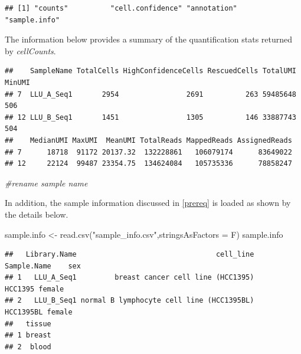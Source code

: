 \documentclass[
  openany]{book}
\newenvironment{Shaded}{\begin{snugshade}}{\end{snugshade}}
\newcommand{\AttributeTok}[1]{\textcolor[rgb]{0.77,0.63,0.00}{#1}}
\newcommand{\CommentTok}[1]{\textcolor[rgb]{0.56,0.35,0.01}{\textit{#1}}}
\newcommand{\FunctionTok}[1]{\textcolor[rgb]{0.00,0.00,0.00}{#1}}
\newcommand{\NormalTok}[1]{#1}
\newcommand{\OtherTok}[1]{\textcolor[rgb]{0.56,0.35,0.01}{#1}}
\newcommand{\SpecialCharTok}[1]{\textcolor[rgb]{0.00,0.00,0.00}{#1}}
\newcommand{\StringTok}[1]{\textcolor[rgb]{0.31,0.60,0.02}{#1}}
\begin{document}
\begin{verbatim}
## [1] "counts"          "cell.confidence" "annotation"      "sample.info"
\end{verbatim}

The information below provides a summary of the quantification stats returned by \emph{cellCounts}.

\begin{Shaded}
\end{Shaded}

\begin{verbatim}
##    SampleName TotalCells HighConfidenceCells RescuedCells TotalUMI MinUMI
## 7  LLU_A_Seq1       2954                2691          263 59485648    506
## 12 LLU_B_Seq1       1451                1305          146 33887743    504
##    MedianUMI MaxUMI  MeanUMI TotalReads MappedReads AssignedReads
## 7      18718  91172 20137.32  132228861   106079174      83649022
## 12     22124  99487 23354.75  134624084   105735336      78858247
\end{verbatim}

\begin{Shaded}
\begin{Highlighting}[]
\CommentTok{\#rename sample name}
\end{Highlighting}
\end{Shaded}

In addition, the sample information discussed in \ref{prereq} is loaded as shown by the details below.

\begin{Shaded}
\begin{Highlighting}[]
\NormalTok{sample.info }\OtherTok{\textless{}{-}} \FunctionTok{read.csv}\NormalTok{(}\StringTok{"sample\_info.csv"}\NormalTok{,}\AttributeTok{stringsAsFactors =}\NormalTok{ F)}
\NormalTok{sample.info}
\end{Highlighting}
\end{Shaded}

\begin{verbatim}
##   Library.Name                                 cell_line Sample.Name    sex
## 1   LLU_A_Seq1         breast cancer cell line (HCC1395)     HCC1395 female
## 2   LLU_B_Seq1 normal B lymphocyte cell line (HCC1395BL)   HCC1395BL female
##   tissue
## 1 breast
## 2  blood
\end{verbatim}
\end{document}
